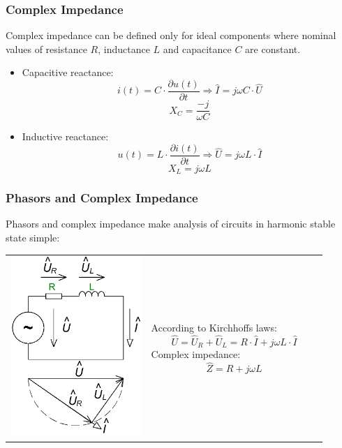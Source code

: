 \documentclass{beamer}
\begin{document}
	\begin{frame}
    \frametitle{Complex Impedance}
		Complex impedance can be defined only for ideal components where nominal values of resistance $R$, inductance $L$ and capacitance $C$ are constant.
		
		\begin{itemize}
			\item Capacitive reactance: $$i(t)= C\cdot\frac{\partial u(t)}{\partial t}\Longrightarrow \hat{I}=j\omega C\cdot\hat{U}$$ $$X_C=\frac{-j}{\omega C}$$
			\item Inductive reactance: $$u(t)= L\cdot\frac{\partial i(t)}{\partial t}\Longrightarrow \hat{U}=j\omega L\cdot\hat{I}$$ $$X_L=j\omega L$$
		\end{itemize}
	\end{frame}
	\begin{frame}
    \frametitle{Phasors and Complex Impedance}
		Phasors and complex impedance make analysis of circuits in harmonic stable state simple:
		\begin{center}
			\begin{tabular}{m{0.4\linewidth} m{0.5\linewidth}}
			\includegraphics[scale=0.25]{obr01_RLobvod.png} &
			According to Kirchhoffs laws:
			$$\hat{U}=\hat{U}_R + \hat{U}_L = R\cdot\hat{I}+j\omega L\cdot\hat{I}$$
			Complex impedance:
			$$\hat{Z}=R+j\omega L$$
			\end{tabular}
		\end{center}
	\end{frame}
\end{document}

